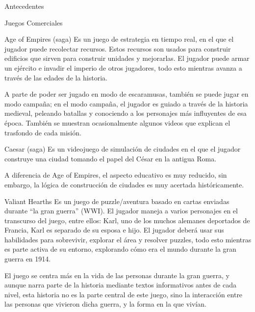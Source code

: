 \begin{section}{Antecedentes}
  \begin{subsection}{Juegos Comerciales}
    \begin{subsubsection}{Age of Empires (saga)}
      Es un juego de estrategia en tiempo real, en el que el jugador puede recolectar recursos. Estos recursos son usados para construir edificios que sirven para construir unidades y mejorarlas. El jugador puede armar un ejército e invadir el imperio de otros jugadores, todo esto mientras avanza a través de las edades de la historia.
      
      A parte de poder ser jugado en modo de escaramusas, también se puede jugar en modo campaña; en el modo campaña, el jugador es guiado a través de la historia medieval, peleando batallas y conociendo a los personajes más influyentes de esa época. También se muestran ocasionalmente algunos videos que explican el trasfondo de cada misión.
    \end{subsubsection}

    \begin{subsubsection}{Caesar (saga)}
      Es un videojuego de simulación de ciudades en el que el jugador construye una ciudad tomando el papel del César en la antigua Roma.

      A diferencia de Age of Empires, el aspecto educativo es muy reducido, sin embargo, la lógica de construcción de ciudades es muy acertada históricamente.
    \end{subsubsection}

    \begin{subsubsection}{Valiant Hearths}
      Es un juego de puzzle/aventura basado en cartas enviadas durante “la gran guerra” (WWI). El jugador maneja a varios personajes en el transcurso del juego, entre ellos: Karl, uno de los muchos alemanes deportados de Francia, Karl es separado de su esposa e hijo. El jugador deberá usar sus habilidades para sobrevivir, explorar el área y resolver puzzles, todo esto mientras es parte activa de su entorno, explorando cómo era el mundo durante la gran guerra en 1914.

      El juego se centra más en la vida de las personas durante la gran guerra, y aunque narra parte de la historia mediante textos informativos antes de cada nivel, esta historia no es la parte central de este juego, sino la interacción entre las personas que vivieron dicha guerra, y la forma en la que vivían. \cite{webpage:ubisoft}
    \end{subsubsection}
  \end{subsection}


\end{section}
